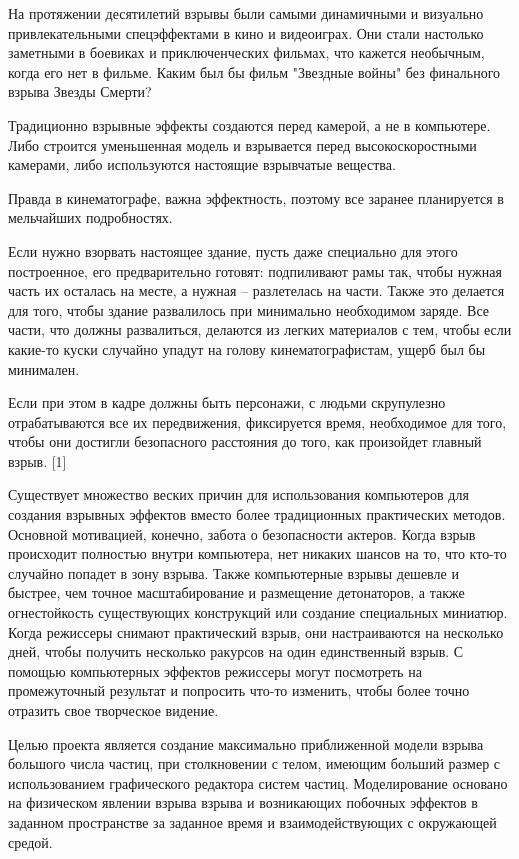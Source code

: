 \Introduction

\hfill

	На протяжении десятилетий взрывы были самыми динамичными и визуально привлекательными спецэффектами в кино и видеоиграх. Они стали настолько заметными в боевиках и приключенческих фильмах, что кажется необычным, когда его нет в фильме. Каким был бы фильм "Звездные войны"  без финального взрыва Звезды Смерти? 
	
	Традиционно взрывные эффекты создаются перед камерой, а не в компьютере. Либо строится уменьшенная модель и взрывается перед высокоскоростными камерами, либо используются настоящие взрывчатые вещества. 
	
	Правда в кинематографе, важна эффектность, поэтому все заранее планируется в мельчайших подробностях.
	
	Если нужно взорвать настоящее здание, пусть даже специально для этого построенное, его предварительно готовят: подпиливают рамы так, чтобы нужная часть их осталась на месте, а нужная – разлетелась на части. Также это делается для того, чтобы здание развалилось при минимально необходимом заряде. Все части, что должны развалиться, делаются из легких материалов с тем, чтобы если какие-то куски случайно упадут на голову кинематографистам, ущерб был бы минимален. 
	
	Если при этом в кадре должны быть персонажи, с людьми скрупулезно отрабатываются все их передвижения, фиксируется время, необходимое для того, чтобы они достигли безопасного расстояния до того, как произойдет главный взрыв. [1]
	
	Существует множество веских причин для использования компьютеров для создания взрывных эффектов вместо более традиционных практических методов. Основной мотивацией, конечно, забота о безопасности актеров. Когда взрыв происходит полностью внутри компьютера, нет никаких шансов на то, что кто-то случайно попадет в зону взрыва. Также компьютерные взрывы дешевле и быстрее, чем точное масштабирование и размещение детонаторов, а также огнестойкость существующих конструкций или создание специальных миниатюр. Когда режиссеры снимают практический взрыв, они настраиваются на несколько дней, чтобы получить несколько ракурсов на один единственный взрыв. С помощью компьютерных эффектов режиссеры могут посмотреть на промежуточный результат и попросить что-то изменить, чтобы более точно отразить свое творческое видение. 
	
	Целью проекта является создание максимально приближенной модели взрыва большого числа частиц, при столкновении с телом, имеющим больший размер с использованием графического редактора систем частиц. Моделирование основано на физическом явлении взрыва взрыва и возникающих побочных эффектов в заданном пространстве за заданное время и взаимодействующих с окружающей средой. 
	
